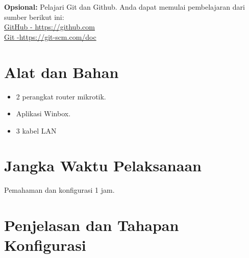 \begin{center}
	\colorbox{cyan!30}{\parbox{0.8\linewidth}{\textbf{Opsional:} Pelajari Git dan Github. Anda dapat memulai pembelajaran dari sumber berikut ini: \\ \href{https://github.com}{GitHub - https://github.com} \\ \href{https://git-scm.com/doc}{Git -https://git-scm.com/doc}}}
\end{center}

\section{Alat dan Bahan}
\begin{itemize}[label=$\bullet$, itemsep=-1pt, leftmargin=*]
	\item 2 perangkat router mikrotik.
	\item Aplikasi Winbox.
	\item 3 kabel LAN
\end{itemize}

\section{Jangka Waktu Pelaksanaan}
Pemahaman dan konfigurasi 1 jam.

\section{Penjelasan dan Tahapan Konfigurasi}

